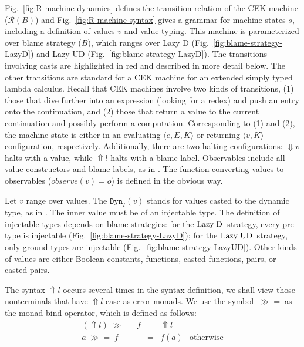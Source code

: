 \documentclass[runningheads]{llncs}
\newcommand{\LUD}{\ensuremath{\text{Lazy\;UD}}}
\newcommand{\LD}{\ensuremath{\text{Lazy\;D}}}
\newcommand{\RMachine}[1]{\ensuremath{\mathcal{R}(#1)}}
\newcommand{\error}[1]{\ensuremath{\Uparrow#1}}
\newcommand{\Pbool}[0]{\ensuremath{\mathtt{Bool}}}
\newcommand{\etrue}[0]{\mathtt{true}}
\newcommand{\ecast}[2]{\ensuremath{#1 : #2}}
\newcommand{\ccast}[3]{#1 \xRightarrow[]{\enskip #2 \enskip} #3}
\newcommand{\vdyn}[2]{\mathtt{Dyn}_{#1}(#2)}
\newcommand{\sexpr}[3]{\ensuremath{\langle#1,#2,#3\rangle}}
\newcommand{\scont}[2]{\ensuremath{\langle#1,#2\rangle}}
\newcommand{\shalt}[1]{\ensuremath{\Downarrow #1}}
\newcommand{\mbind}[0]{\ensuremath{\;\gg=\;}}
\begin{document}
Fig.~\ref{fig:R-machine-dynamics} defines the transition relation of the CEK
machine (\RMachine{B}) and Fig.~\ref{fig:R-machine-syntax} gives a grammar for machine 
states $s$, including a definition of values $v$ and value typing.
%
This machine is parameterized over blame strategy ($B$), which ranges over
Lazy D (Fig.~\ref{fig:blame-strategy-LazyD}) and Lazy UD 
(Fig.~\ref{fig:blame-strategy-LazyD}).
%
The transitions involving casts are highlighted in red and described in
more detail below. The other transitions are standard for a CEK
machine for an extended simply typed lambda calculus.
%
Recall that CEK machines involve two kinds of transitions, (1) those
that dive further into an expression (looking for a redex) and push an
entry onto the continuation, and (2) those that return a value to the
current continuation and possibly perform a computation.
Corresponding to (1) and (2), the machine state is either in an evaluating
$\sexpr{e}{E}{K}$ or returning $\scont{v}{K}$ configuration, 
respectively. Additionally, there are two halting configurations: \shalt{v} 
halts with a value, while \error{l} halts with a blame label. 
Observables include all value constructors and blame labels, as in 
\citep{siek2012interpretations}. 
The function converting values to observables ($observe(v) = o$) is defined in 
the obvious way.

Let $v$ range over values. The 
$\vdyn{I}{v}$ stands for values casted to the dynamic type, as in 
\citep{wadler2009well}. The inner value must be of an 
injectable type. The definition of injectable types depends on blame 
strategies:
%
for the \LD\ strategy, every pre-type is injectable 
(Fig.~\ref{fig:blame-strategy-LazyD});
%
for the \LUD\ strategy, only ground types are injectable 
(Fig.~\ref{fig:blame-strategy-LazyUD}).
%
Other kinds of values are either Boolean constants, functions, casted 
functions, pairs, or casted pairs.

The syntax \error{l} occurs several times in the syntax definition, we shall 
view those nonterminals that have \error{l} case as error monads. We use 
the symbol \mbind as the monad bind operator, which is defined as follows:
\[
\begin{array}{rcll}
(\error{l}) \mbind f & = & \error{l} \\
          a \mbind f & = & f(a)      & \text{otherwise}
\end{array}
\]
\end{document}
